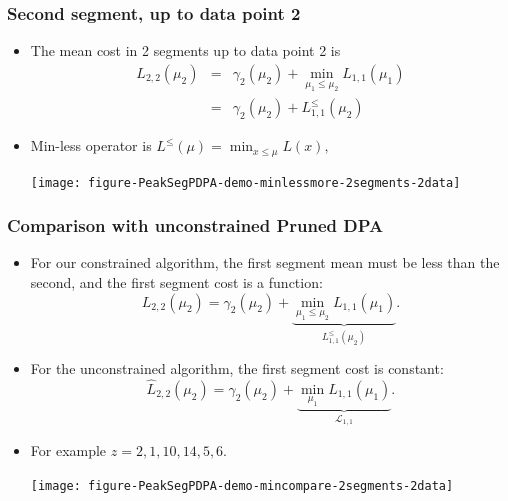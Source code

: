 \documentclass{beamer}
\begin{document}
\begin{frame}[fragile]
  \frametitle{Second segment, up to data point 2}
  \begin{itemize}
  \item The mean cost in 2 segments up to data point 2 is
\begin{eqnarray*}
  L_{2,2}(\mu_2) 
  &=&  \gamma_2(\mu_2)+\min_{\mu_1 \leq \mu_2} L_{1,1}(\mu_1)\\
  &=& \gamma_2(\mu_2)+L_{1,1}^{\leq}(\mu_2)
\end{eqnarray*}
\item Min-less operator is $L^\leq(\mu) = \min_{x\leq\mu} L(x),$
    \begin{center}
      \texttt{[image: figure-PeakSegPDPA-demo-minlessmore-2segments-2data]}
    \end{center}
\end{itemize}
\end{frame}

\begin{frame}
  \frametitle{Comparison with unconstrained Pruned DPA}
  \begin{itemize}
  \item For our constrained algorithm, the first segment mean must be
    less than the second, and the first segment cost is a function:
    \begin{equation*}
      L_{2,2}(\mu_2) = \gamma_2(\mu_2)+
      \underbrace{\min_{\mu_1 \leq \mu_2} L_{1,1}(\mu_1)}_{L^\leq_{1,1}(\mu_2)}.
    \end{equation*}
  \item For the unconstrained algorithm, the first segment cost is constant:
    \begin{equation*}
      \widehat{L}_{2,2}(\mu_2) = \gamma_2(\mu_2)+
      \underbrace{\min_{\mu_1} L_{1,1}(\mu_1)}_{\mathcal L_{1,1}}.
    \end{equation*}
  \item For example $z = 2, 1, 10, 14, 5, 6$.
    \begin{center}
      \texttt{[image: figure-PeakSegPDPA-demo-mincompare-2segments-2data]}
    \end{center}
  \end{itemize}
\end{frame}
\end{document}
